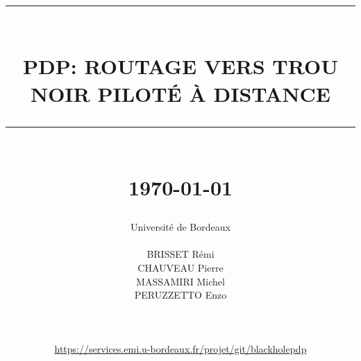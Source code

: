 \documentclass[11pt]{report}
\newcommand{\HRule}[1]{\rule{\linewidth}{#1}}
\begin{document}
\title
{
	\Large{}
	\HRule{2pt} \\ [0.5cm]
	\LARGE \textbf{\uppercase{PDP: Routage vers trou noir piloté à distance}}
	\HRule{2pt} \\ [0.5cm]
    	\normalsize \today
}

\date{}


\author
{
	\LARGE{Université de Bordeaux} \\
	\\
    BRISSET Rémi \\
    CHAUVEAU Pierre\\
    MASSAMIRI Michel \\
    PERUZZETTO Enzo \\
    \\
    \\
    \\
    \url{https://services.emi.u-bordeaux.fr/projet/git/blackholepdp}
}

\maketitle
\tableofcontents









\end{document}
